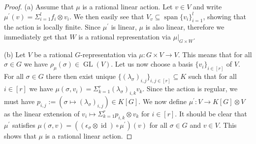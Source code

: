 \begin{proof}
  (a) \; Assume that $\mu$ is a rational linear action.
  Let $v \in V$ and write $\mu^\prime (v) = \Sigma_{i=1}^l f_i \otimes v_i$. %
  We then easily see that $V_v \subseteq \operatorname{span}\{v_i\}_{i=1}^l$, showing that the action is locally finite. %
  Since $\mu^\prime$ is linear, $\mu$ is also linear, therefore we immediately get that $W$ is a rational representation via $\left. \mu \right|_{G\times W}$.

  (b) \; Let $V$ be a rational $G$-representation via $\mu \colon G \times V \rightarrow V$.
  This means that for all $\sigma \in G$ we have $\rho_\mu (\sigma) \in \operatorname{GL}(V)$.
  Let us now choose a basis $\{v_i\}_{i \in [r]}$ of $V$.
  For all $\sigma \in G$ there then exist unique $\{ \left( \lambda_\sigma \right)_{i,j}\}_{i,j \in [r]} \subseteq K$ such that for all $i \in [r]$ we have $\mu (\sigma,v_i) = \Sigma_{k=1}^r \left(\lambda_\sigma\right)_{i,k} v_k$.
  Since the action is regular, we must have $p_{i,j} := ( \sigma \mapsto (\lambda_\sigma)_{i,j}) \in K[G]$.
  We now define $\mu^\prime \colon V \rightarrow K[G] \otimes V$ as the linear extension of $v_i \mapsto \Sigma_{k=1}^r p_{i,k} \otimes v_k$ for $i \in [r]$.
  It should be clear that $\mu^\prime$ satisfies $ \mu \left( \sigma , v \right) = \left( \left( \epsilon_\sigma \otimes \operatorname{id} \right) \circ \mu^\prime \right) \left(v\right) $ for all $\sigma \in G$ and $v \in V$.
  This shows that $\mu$ is a rational linear action.
  \end{proof}

